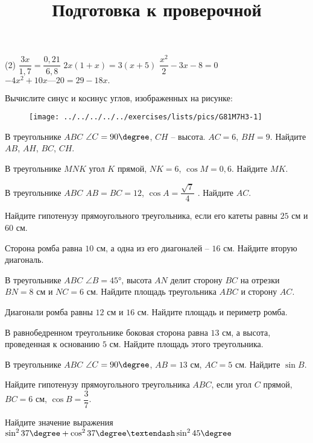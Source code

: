 \begin{homework}[number=3]
	\begin{listofex}
		\item \begin{tasks}(2)
			\task \(\dfrac{3x}{1,7}=\dfrac{0,21}{6,8}\)
			\task \( 2x(1+x)=3(x+5)	 \)
			\task \(\dfrac{x^2}{2}-3x-8=0\)
			\task \( -4x^{2} + 10x — 20 = 29-18x.\)
		\end{tasks}
		\item Вычислите синус и косинус углов, изображенных на рисунке:
		\begin{figure}[h!]
			\centering
			\texttt{[image: ../../../../../exercises/lists/pics/G81M7H3-1]}
		\end{figure}
		\item В треугольнике \( ABC \) \( \angle C = 90\degree \), \( CH \) – высота. \( AC = 6 \), \( BH = 9 \). Найдите \( AB \), \( AH \), \( BC \), \( CH \).
		\item В треугольнике \( MNK \) угол \( K \) прямой,
		\( NK=6 \), \( \cos M=0,6 \). Найдите \( MK \).
		\item  В треугольнике \( ABC \) \(AB = BC = 12 \), \( \cos A = \dfrac{\sqrt{7}}{4} \) . Найдите \(AC \).
	\end{listofex}
\end{homework}

\begin{class}[number=7]
	\title{Подготовка к проверочной}
	\begin{listofex}
		\item Найдите гипотенузу прямоугольного треугольника, если его катеты равны \( 25 \) см и \( 60 \) см.
		\item Сторона ромба равна \( 10 \) см, а одна из его диагоналей – \( 16 \) см. Найдите вторую диагональ.
		\item  В треугольнике  \( ABC \) \( \angle B = 45° \), высота \( AN \) делит сторону \(BC \) на отрезки \( BN = 8 \) см и \( NC = 6 \) см. Найдите площадь треугольника \( ABC \) и сторону \( AC \).
		\item Диагонали ромба равны \( 12 \) см и \( 16 \) см. Найдите площадь и периметр ромба.
		\item В равнобедренном треугольнике боковая сторона равна \( 13 \) см, а высота, проведенная к основанию \( 5 \) см. Найдите площадь этого треугольника.
		\item  В треугольнике \( ABC \) \( \angle C = 90\degree \), \( AB = 13 \) см, \( AC = 5 \) см. Найдите \( \sin B \).
		\item Найдите гипотенузу прямоугольного треугольника \( ABC \), если угол \( C \) прямой, \( BC = 6 \) см, \( \cos B = \dfrac{3}{7} \).
		\item Найдите значение выражения \( \sin^{2} 37\degree + \cos^{2 } 37\degree – \sin^{2 } 45\degree \)
	\end{listofex}
\end{class}

